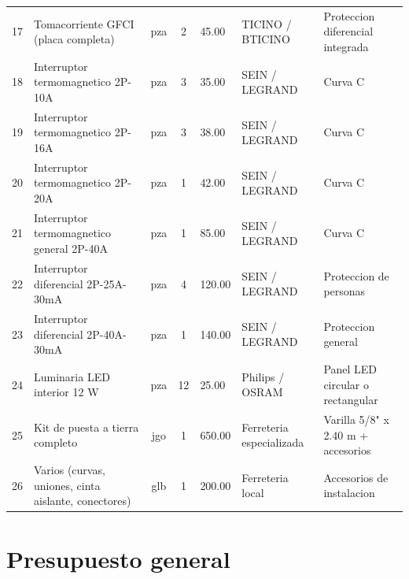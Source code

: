 \begin{table}[H]
\begin{tabularx}{\textwidth}{c Y c c R{1.8cm} L{2.0cm} L{2.5cm}}
17 & Tomacorriente GFCI (placa completa) & pza & 2 & 45.00 & TICINO / BTICINO & Proteccion diferencial integrada \\
18 & Interruptor termomagnetico 2P-10A & pza & 3 & 35.00 & SEIN / LEGRAND & Curva C \\
19 & Interruptor termomagnetico 2P-16A & pza & 3 & 38.00 & SEIN / LEGRAND & Curva C \\
20 & Interruptor termomagnetico 2P-20A & pza & 1 & 42.00 & SEIN / LEGRAND & Curva C \\
21 & Interruptor termomagnetico general 2P-40A & pza & 1 & 85.00 & SEIN / LEGRAND & Curva C \\
22 & Interruptor diferencial 2P-25A-30mA & pza & 4 & 120.00 & SEIN / LEGRAND & Proteccion de personas \\
23 & Interruptor diferencial 2P-40A-30mA & pza & 1 & 140.00 & SEIN / LEGRAND & Proteccion general \\
24 & Luminaria LED interior 12 W & pza & 12 & 25.00 & Philips / OSRAM & Panel LED circular o rectangular \\
25 & Kit de puesta a tierra completo & jgo & 1 & 650.00 & Ferreteria especializada & Varilla 5/8" x 2.40 m + accesorios \\
26 & Varios (curvas, uniones, cinta aislante, conectores) & glb & 1 & 200.00 & Ferreteria local & Accesorios de instalacion \\
\bottomrule
\end{tabularx}
\end{table}

\clearpage

\section{Presupuesto general}

